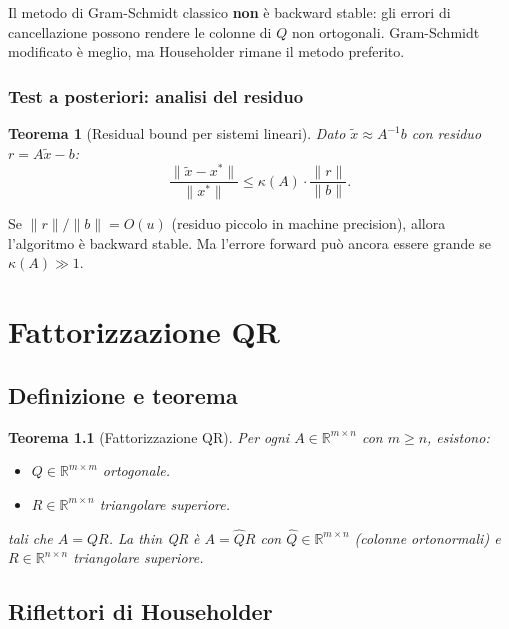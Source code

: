 \documentclass[11pt, a4paper, twoside]{book}
\theoremstyle{definition}
\theoremstyle{plain}
\newtheorem{thm}{Teorema}[chapter]
\theoremstyle{remark}
\newcommand{\R}{\mathbb{R}}
\begin{document}
\begin{warningbox}
Il metodo di Gram-Schmidt classico \textbf{non} è backward stable: gli errori di cancellazione possono rendere le colonne di $Q$ non ortogonali. Gram-Schmidt modificato è meglio, ma Householder rimane il metodo preferito.
\end{warningbox}

\subsection{Test a posteriori: analisi del residuo}

\begin{thm}[Residual bound per sistemi lineari]
Dato $\tilde{x} \approx A^{-1}b$ con residuo $r = A\tilde{x} - b$:
\[
  \frac{\|\tilde{x} - x^*\|}{\|x^*\|} \leq \kappa(A) \cdot \frac{\|r\|}{\|b\|}.
\]
\end{thm}

Se $\|r\|/\|b\| = O(u)$ (residuo piccolo in machine precision), allora l'algoritmo è backward stable. Ma l'errore forward può ancora essere grande se $\kappa(A) \gg 1$.

\chapter{Fattorizzazione QR}

\section{Definizione e teorema}

\begin{thm}[Fattorizzazione QR]
Per ogni $A \in \R^{m \times n}$ con $m \geq n$, esistono:
\begin{itemize}
  \item $Q \in \R^{m \times m}$ ortogonale.
  \item $R \in \R^{m \times n}$ triangolare superiore.
\end{itemize}
tali che $A = QR$. La \emph{thin QR} è $A = \hat{Q}R$ con $\hat{Q} \in \R^{m \times n}$ (colonne ortonormali) e $R \in \R^{n \times n}$ triangolare superiore.
\end{thm}

\section{Riflettori di Householder}
\label{sec:householder}
\end{document}
